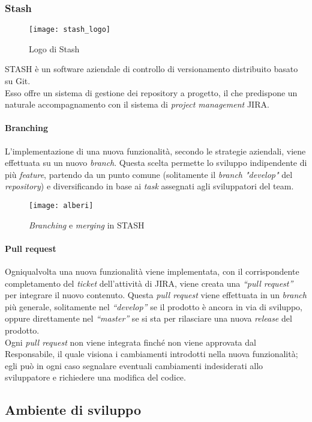 \subsubsection{Stash}
\begin{figure}[htb] 
    \centering 
    \texttt{[image: stash\_logo]} 
    \caption{Logo di Stash}
\end{figure}
STASH è un software aziendale di controllo di versionamento distribuito basato su Git.\\
Esso offre un sistema di gestione dei repository a progetto, il che predispone un naturale accompagnamento con il sistema di \emph{project management} JIRA.

\paragraph{Branching}
L’implementazione di una nuova funzionalità, secondo le strategie aziendali, viene effettuata su un nuovo \emph{branch}. Questa scelta permette lo sviluppo indipendente di più \emph{feature}, partendo da un punto comune (solitamente il \emph{branch "develop"} del \emph{repository}) e diversificando in base ai \emph{task} assegnati agli sviluppatori del team.
\begin{figure}[htb] 
    \centering 
    \texttt{[image: alberi]} 
    \caption{\emph{Branching} e \emph{merging} in STASH}
\end{figure}

\paragraph{Pull request}
Ogniqualvolta una nuova funzionalità viene implementata, con il corrispondente completamento del \emph{ticket} dell’attività di JIRA, viene creata una \emph{“pull request”} per integrare il nuovo contenuto. Questa \emph{pull request} viene effettuata in un \emph{branch} più generale, solitamente nel \emph{“develop”} se il prodotto è ancora in via di sviluppo, oppure direttamente nel \emph{“master”} se si sta per rilasciare una nuova \emph{release} del prodotto.\\
Ogni \emph{pull request} non viene integrata finché non viene approvata dal Responsabile, il quale visiona i cambiamenti introdotti nella nuova funzionalità; egli può in ogni caso segnalare eventuali cambiamenti indesiderati allo sviluppatore e richiedere una modifica del codice.

\subsection{Ambiente di sviluppo}
